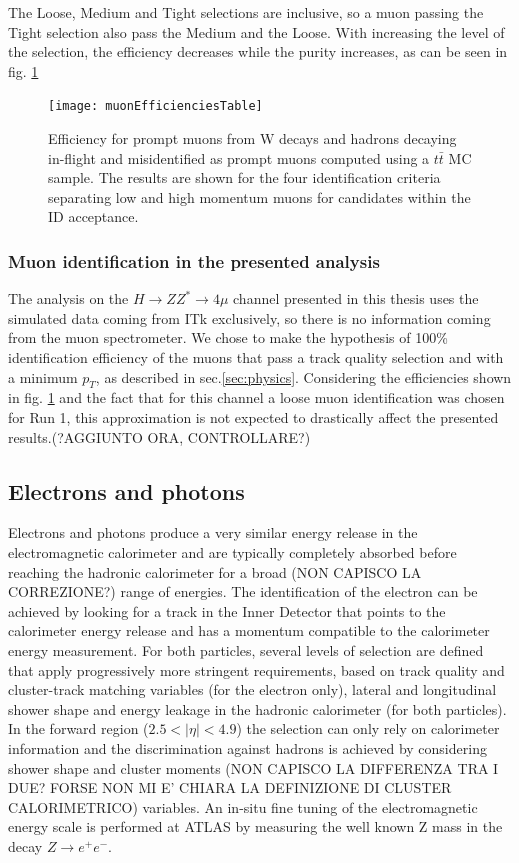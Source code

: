 \documentclass[a4paper,twoside,12pt]{article}
\begin{document}
The Loose, Medium and Tight selections are inclusive, so a muon passing the Tight selection also pass the Medium and the Loose. With increasing the level of the selection, the efficiency decreases
while the purity increases, as can be seen in fig. \ref{fig:muonEfficienciesTable}

\begin{figure}
\centering
\texttt{[image: muonEfficienciesTable]}
\caption{Efficiency for prompt muons from W decays and hadrons decaying in-flight
and misidentified as prompt muons computed using a $t\bar{t}$ MC sample\cite{muonReconstruction}. The results are shown for the 
four identification criteria separating low and high momentum muons for candidates
within the ID acceptance.}
\label{fig:muonEfficienciesTable}
\end{figure}

\subsubsection*{Muon identification in the presented analysis}
The analysis on the $H \rightarrow ZZ^{*} \rightarrow 4\mu$ channel presented in this thesis uses the simulated data coming from ITk exclusively, so there is no information coming from the muon spectrometer. We chose to make the hypothesis of 100\% identification efficiency of the muons that pass a track quality selection and with a minimum $p_{T}$, as described in sec.\ref{sec:physics}. Considering the efficiencies shown in fig. \ref{fig:muonEfficienciesTable}
and the fact that for this channel a loose muon identification was chosen for Run 1, this
approximation is not expected to drastically affect the presented results.(?AGGIUNTO ORA, CONTROLLARE?)

\subsection{Electrons and photons}
Electrons and photons produce a very similar energy release in the electromagnetic calorimeter and are typically completely absorbed before reaching the hadronic calorimeter for a broad (NON CAPISCO LA CORREZIONE?) range of energies. The identification of the
electron can be achieved by 
looking for a track in the Inner Detector that points to the calorimeter energy release and has a momentum compatible to the calorimeter energy measurement. For both particles, several levels of selection are defined that apply progressively
more stringent requirements, based on track quality and cluster-track matching variables (for the electron only), lateral and longitudinal shower shape and energy leakage in the 
hadronic calorimeter (for both particles). In the forward region ($2.5 < |\eta| < 4.9$) the 
selection can only rely on calorimeter information and the discrimination against hadrons
is achieved by considering shower shape and cluster moments (NON CAPISCO LA DIFFERENZA TRA I DUE? FORSE NON MI E' CHIARA LA DEFINIZIONE DI CLUSTER CALORIMETRICO) variables. An in-situ fine tuning
of the electromagnetic energy scale is performed at ATLAS by measuring the well known 
Z mass in the decay $Z \rightarrow e^+e^-$.
\end{document}
